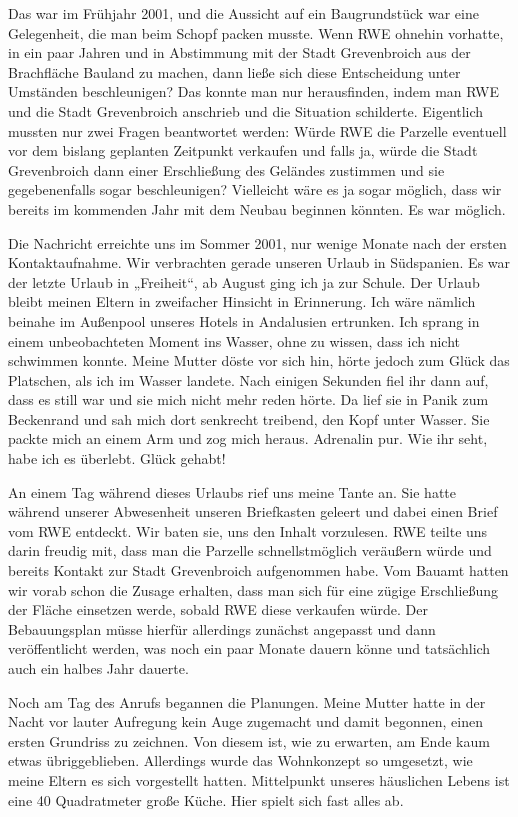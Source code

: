 \documentclass[fontsize=14pt,a4paper,headinclude,DIV=calc,automark]{scrbook}
\begin{document}
Das war im Frühjahr 2001, und die Aussicht auf ein Baugrundstück war eine Gelegenheit, die man beim Schopf packen musste. Wenn RWE ohnehin vorhatte, in ein paar Jahren und in Abstimmung mit der Stadt Grevenbroich aus der Brachfläche Bauland zu machen, dann ließe sich diese Entscheidung unter Umständen beschleunigen? Das konnte man nur herausfinden, indem man RWE und die Stadt Grevenbroich anschrieb und die Situation schilderte. Eigentlich mussten nur zwei Fragen beantwortet werden: Würde RWE die Parzelle eventuell vor dem bislang geplanten Zeitpunkt verkaufen und falls ja, würde die Stadt Grevenbroich dann einer Erschließung des Geländes zustimmen und sie gegebenenfalls sogar beschleunigen? Vielleicht wäre es ja sogar möglich, dass wir bereits im kommenden Jahr mit dem Neubau beginnen könnten. Es war möglich.

Die Nachricht erreichte uns im Sommer 2001, nur wenige Monate nach der ersten Kontaktaufnahme. Wir verbrachten gerade unseren Urlaub in Südspanien. Es war der letzte Urlaub in „Freiheit“, ab August ging ich ja zur Schule. Der Urlaub bleibt meinen Eltern in zweifacher Hinsicht in Erinnerung. Ich wäre nämlich beinahe im Außenpool unseres Hotels in Andalusien ertrunken. Ich sprang in einem unbeobachteten Moment ins Wasser, ohne zu wissen, dass ich nicht schwimmen konnte. Meine Mutter döste vor sich hin, hörte jedoch zum Glück das Platschen, als ich im Wasser landete. Nach einigen Sekunden fiel ihr dann auf, dass es still war und sie mich nicht mehr reden hörte. Da lief sie in Panik zum Beckenrand und sah mich dort senkrecht treibend, den Kopf unter Wasser. Sie packte mich an einem Arm und zog mich heraus. Adrenalin pur. Wie ihr seht, habe ich es überlebt. Glück gehabt!

An einem Tag während dieses Urlaubs rief uns meine Tante an. Sie hatte während unserer Abwesenheit unseren Briefkasten geleert und dabei einen Brief vom RWE entdeckt. Wir baten sie, uns den Inhalt vorzulesen. RWE teilte uns darin freudig mit, dass man die Parzelle schnellstmöglich veräußern würde und bereits Kontakt zur Stadt Grevenbroich aufgenommen habe. Vom Bauamt hatten wir vorab schon die Zusage erhalten, dass man sich für eine zügige Erschließung der Fläche einsetzen werde, sobald RWE diese verkaufen würde. Der Bebauungsplan müsse hierfür allerdings zunächst angepasst und dann veröffentlicht werden, was noch ein paar Monate dauern könne und tatsächlich auch ein halbes Jahr dauerte.

Noch am Tag des Anrufs begannen die Planungen. Meine Mutter hatte in der Nacht vor lauter Aufregung kein Auge zugemacht und damit begonnen, einen ersten Grundriss zu zeichnen. Von diesem ist, wie zu erwarten, am Ende kaum etwas übriggeblieben. Allerdings wurde das Wohnkonzept so umgesetzt, wie meine Eltern es sich vorgestellt hatten. Mittelpunkt unseres häuslichen Lebens ist eine 40 Quadratmeter große Küche. Hier spielt sich fast alles ab.
\end{document}

